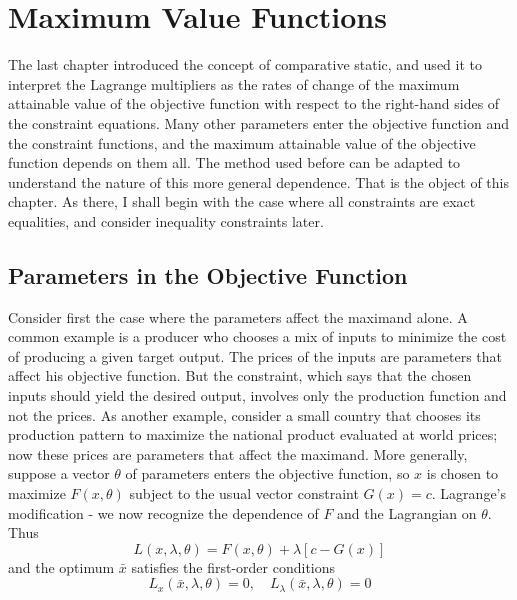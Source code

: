 \chapter{Maximum Value Functions}

The last chapter introduced the concept of comparative static, and used it to interpret the Lagrange multipliers as the rates of change of the maximum attainable value of the objective function with respect to the right-hand sides of the constraint equations. Many other parameters enter the objective function and the constraint functions, and the maximum attainable value of the objective function depends on them all. The method used before can be adapted to understand the nature of this more general dependence. That is the object of this chapter. As there, I shall begin with the case where all constraints are exact equalities, and consider inequality constraints later.

\section*{Parameters in the Objective Function}

Consider first the case where the parameters affect the maximand alone. A common example is a producer who chooses a mix of inputs to minimize the cost of producing a given target output. The prices of the inputs are parameters that affect his objective function. But the constraint, which says that the chosen inputs should yield the desired output, involves only the production function and not the prices. As another example, consider a small country that chooses its production pattern to maximize the national product evaluated at world prices; now these prices are parameters that affect the maximand. More generally, suppose a vector $\theta$ of parameters enters the objective function, so $x$ is chosen to maximize $F(x,\theta)$ subject to the usual vector constraint $G(x)=c$. Lagrange's modification - we now recognize the dependence of $F$ and the Lagrangian on $\theta$. Thus
\begin{equation*}
L(x, \lambda, \theta) = F(x, \theta) + \lambda[c-G(x)]
\end{equation*}
and the optimum $\bar{x}$ satisfies the first-order conditions
\begin{equation*}
L_x(\bar{x}, \lambda, \theta)=0, \quad L_\lambda(\bar{x},\lambda, \theta)=0
\end{equation*}


